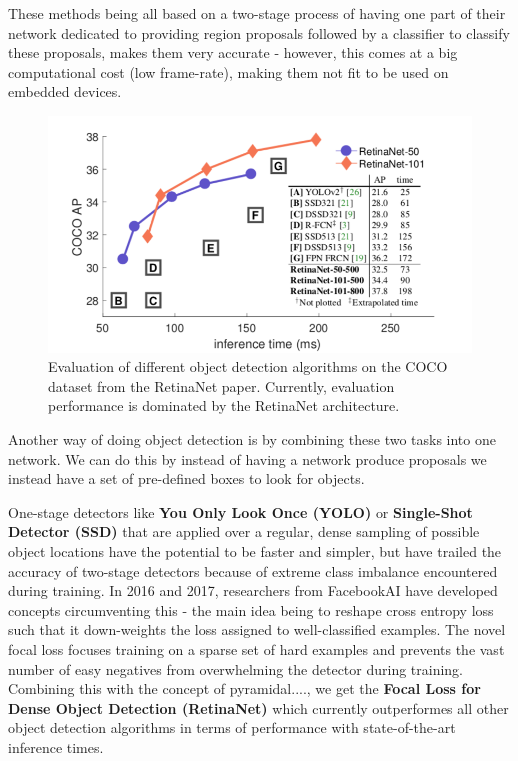 \documentclass[a4paper]{article}
\begin{document}
These methods being all based on a two-stage process of having one part of their network dedicated to providing region proposals followed by a classifier to classify these proposals, makes them very accurate - however, this comes at a big computational cost (low frame-rate), making them not fit to be used on embedded devices.\\
\begin{figure}

\includegraphics[scale=0.32]{images/retinanet}
\caption{Evaluation of different object detection algorithms on the COCO dataset from the RetinaNet paper. Currently, evaluation performance is dominated by the RetinaNet architecture.}
\end{figure}
Another way of doing object detection is by combining these two tasks into one network. We can do this by instead of having a network produce proposals we instead have a set of pre-defined boxes to look for objects.



One-stage detectors like \textbf{You Only Look Once (YOLO)} \cite{DBLP:journals/corr/RedmonDGF15}\cite{DBLP:journals/corr/RedmonF16}\cite{DBLP:journals/corr/abs-1804-02767} or \textbf{Single-Shot Detector (SSD)} \cite{DBLP:journals/corr/LiuAESR15} that are applied over a regular, dense sampling of possible object locations have the potential to be faster and simpler, but have trailed the accuracy of two-stage detectors because of extreme class imbalance encountered during training.
In 2016 and 2017, researchers from FacebookAI have developed concepts \cite{DBLP:journals/corr/abs-1708-02002}\cite{DBLP:journals/corr/LinDGHHB16}circumventing this - the main idea being to reshape cross entropy loss such that it down-weights the loss assigned to well-classified examples. The novel focal loss focuses training on a sparse set of hard examples and prevents the vast number of easy negatives from overwhelming the detector during training. Combining this with the concept of pyramidal...., we get the \textbf{Focal Loss for Dense Object Detection (RetinaNet)} which currently outperformes all other object detection algorithms in terms of performance with state-of-the-art inference times. 
\end{document}
